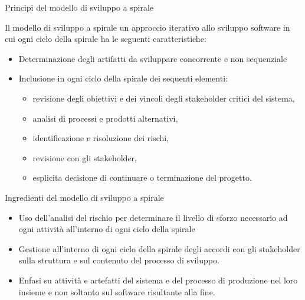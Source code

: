 \documentclass{beamer}
\begin{document}
\begin{frame}{\centerline{Principi del modello di sviluppo a spirale}}


Il modello di sviluppo a spirale \est{} un approccio iterativo allo sviluppo software in cui ogni ciclo della spirale ha le seguenti caratteristiche:

\begin{itemize}

\item  Determinazione degli artifatti da sviluppare concorrente e non sequenziale

\item  Inclusione in ogni ciclo della spirale dei sequenti elementi:

\begin{itemize}
\item  revisione degli obiettivi e dei vincoli degli stakeholder critici del sistema,
\item  analisi di processi e prodotti alternativi,
\item  identificazione e risoluzione dei rischi,
\item  revisione con gli stakeholder,
\item  esplicita decisione di continuare o terminazione del progetto.
\end{itemize}
\end{itemize}
\end{frame}
\begin{frame}{\centerline{Ingredienti del modello di sviluppo a spirale}}


\begin{itemize}
\item  Uso dell'analisi del rischio per determinare il livello di sforzo necessario ad ogni attivit\`{a} all'interno di ogni ciclo della spirale

\item  Gestione all'interno di ogni ciclo della spirale degli accordi con gli stakeholder sulla struttura e sul contenuto del processo di sviluppo.

\item  Enfasi su attivit\`{a} e artefatti del sistema e del processo di produzione nel loro insieme e non soltanto sul software risultante alla fine.

\end{itemize}


\end{frame}
\end{document}
